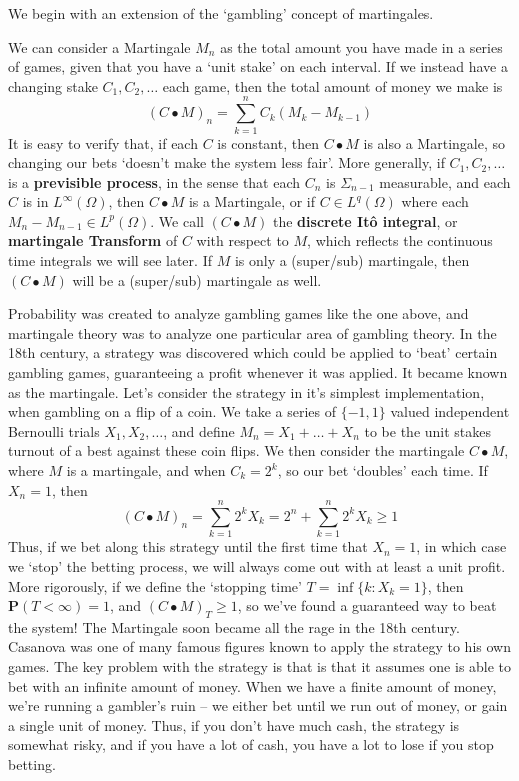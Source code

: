 We begin with an extension of the `gambling' concept of martingales.

\begin{example}
    We can consider a Martingale $M_n$ as the total amount you have made in a series of games, given that you have a `unit stake' on each interval. If we instead have a changing stake $C_1, C_2, \dots$ each game, then the total amount of money we make is
    \[ (C \bullet M)_n = \sum_{k = 1}^n C_k(M_k - M_{k-1}) \]
    It is easy to verify that, if each $C$ is constant, then $C \bullet M$ is also a Martingale, so changing our bets `doesn't make the system less fair'. More generally, if $C_1, C_2, \dots$ is a {\bf previsible process}, in the sense that each $C_n$ is $\Sigma_{n-1}$ measurable, and each $C$ is in $L^\infty(\Omega)$, then $C \bullet M$ is a Martingale, or if $C \in L^q(\Omega)$ where each $M_n - M_{n-1} \in L^p(\Omega)$. We call $(C \bullet M)$ the {\bf discrete It\^{o} integral}, or {\bf martingale Transform} of $C$ with respect to $M$, which reflects the continuous time integrals we will see later. If $M$ is only a (super/sub) martingale, then $(C \bullet M)$ will be a (super/sub) martingale as well.
\end{example}

Probability was created to analyze gambling games like the one above, and martingale theory was to analyze one particular area of gambling theory. In the 18th century, a strategy was discovered which could be applied to `beat' certain gambling games, guaranteeing a profit whenever it was applied. It became known as the martingale. Let's consider the strategy in it's simplest implementation, when gambling on a flip of a coin. We take a series of $\{ -1, 1 \}$ valued independent Bernoulli trials $X_1, X_2, \dots$, and define $M_n = X_1 + \dots + X_n$ to be the unit stakes turnout of a best against these coin flips. We then consider the martingale $C \bullet M$, where $M$ is a martingale, and when $C_k = 2^k$, so our bet `doubles' each time. If $X_n = 1$, then
%
\[ (C \bullet M)_n = \sum_{k = 1}^n 2^k X_k = 2^n + \sum_{k = 1}^n 2^k X_k \geq 1 \]
%
Thus, if we bet along this strategy until the first time that $X_n = 1$, in which case we `stop' the betting process, we will always come out with at least a unit profit. More rigorously, if we define the `stopping time' $T = \inf \{ k : X_k = 1 \}$, then $\mathbf{P}(T < \infty) = 1$, and $(C \bullet M)_T \geq 1$, so we've found a guaranteed way to beat the system! The Martingale soon became all the rage in the 18th century. Casanova was one of many famous figures known to apply the strategy to his own games. The key problem with the strategy is that is that it assumes one is able to bet with an infinite amount of money. When we have a finite amount of money, we're running a gambler's ruin -- we either bet until we run out of money, or gain a single unit of money. Thus, if you don't have much cash, the strategy is somewhat risky, and if you have a lot of cash, you have a lot to lose if you stop betting.

